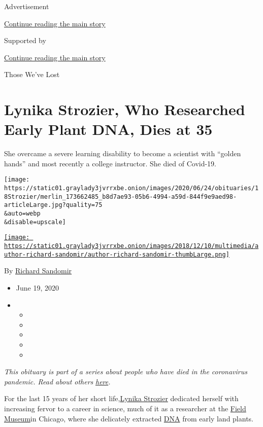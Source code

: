 Advertisement

\protect\hyperlink{after-top}{Continue reading the main story}

Supported by

\protect\hyperlink{after-sponsor}{Continue reading the main story}

Those We've Lost

\hypertarget{lynika-strozier-who-researched-early-plant-dna-dies-at-35}{%
\section{Lynika Strozier, Who Researched Early Plant DNA, Dies at
35}\label{lynika-strozier-who-researched-early-plant-dna-dies-at-35}}

She overcame a severe learning disability to become a scientist with
``golden hands'' and most recently a college instructor. She died of
Covid-19.

\texttt{[image: https://static01.graylady3jvrrxbe.onion/images/2020/06/24/obituaries/18Strozier/merlin\_173662485\_b8d7ae93-05b6-4994-a59d-844f9e9aed98-articleLarge.jpg?quality=75\\\&auto=webp\\\&disable=upscale]}

\href{https://www.nytimes3xbfgragh.onion/by/richard-sandomir}{\texttt{[image: https://static01.graylady3jvrrxbe.onion/images/2018/12/10/multimedia/author-richard-sandomir/author-richard-sandomir-thumbLarge.png]}}

By \href{https://www.nytimes3xbfgragh.onion/by/richard-sandomir}{Richard
Sandomir}

\begin{itemize}
\item
  June 19, 2020
\item
  \begin{itemize}
  \item
  \item
  \item
  \item
  \item
  \end{itemize}
\end{itemize}

\emph{This obituary is part of a series about people who have died in
the coronavirus pandemic. Read about others}
\href{https://www.nytimes3xbfgragh.onion/interactive/2020/obituaries/people-died-coronavirus-obituaries.html}{\emph{here}}\emph{.}

For the last 15 years of her short
life,\href{https://www.chicagotribune.com/news/ct-xpm-2012-02-06-ct-met-trice-hard-life-0206-20120206-story.html}{Lynika
Strozier} dedicated herself with increasing fervor to a career in
science, much of it as a researcher at the
\href{https://www.fieldmuseum.org/}{Field Museum}in Chicago, where she
delicately extracted
\href{https://www.nytimes3xbfgragh.onion/2020/07/04/health/coronavirus-neanderthals.html}{DNA}
from early land plants.

